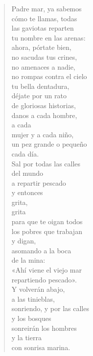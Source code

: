 \documentclass[12pt]{article}
\begin{document}
\begin{verse}
Padre mar, ya sabemos\\
cómo te llamas, todas\\
las gaviotas reparten\\
tu nombre en las arenas:\\
ahora, pórtate bien,\\
no sacudas tus crines,\\
no amenaces a nadie,\\
no rompas contra el cielo\\
tu bella dentadura,\\
déjate por un rato\\
de gloriosas historias,\\
danos a cada hombre,\\
a cada\\
mujer y a cada niño,\\
un pez grande o pequeño\\
cada día.\\
Sal por todas las calles\\
del mundo\\
a repartir pescado\\
y entonces\\
grita,\\
grita\\
para que te oigan todos\\
los pobres que trabajan\\
y digan,\\
asomando a la boca\\
de la mina:\\
«Ahí viene el viejo mar\\
repartiendo pescado».\\
Y volverán abajo,\\
a las tinieblas,\\
sonriendo, y por las calles\\
y los bosques\\
sonreirán los hombres\\
y la tierra\\
con sonrisa marina.  


\end{verse}
\end{document}
